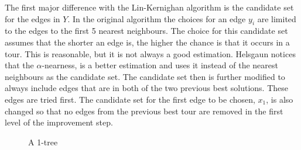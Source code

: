 \documentclass[12pt]{article}
\begin{document}
    The first major difference with the Lin-Kernighan algorithm is the candidate set for the edges
    in $Y$. In the original algorithm the choices for an edge $y_i$ are limited to the edges to the
    first 5 nearest neighbours. The choice for this candidate set assumes that the shorter an edge
    is, the higher the chance is that it occurs in a tour. This is reasonable, but it is not always
    a good estimation. Helsgaun notices that the $\alpha$-nearness, is a better estimation and uses
    it instead of the nearest neighbours as the candidate set.
    The candidate set then is further modified to always include edges that are in both of the two
    previous best solutions. These edges are tried first.
    The candidate set for the first edge to be chosen, $x_1$, is also changed so that no edges from
    the previous best tour are removed in the first level of the improvement step.

    \begin{figure}
    \centering
    \caption{A 1-tree}
    \label{fig:1-tree}
    \end{figure}
\end{document}
